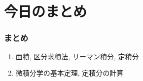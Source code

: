 %
%
%
%













\section{今日のまとめ}
\begin{frame}
\frametitle{まとめ}   


\begin{enumerate}
\item 面積, 区分求積法, リーマン積分, 定積分
\item 微積分学の基本定理, 定積分の計算
\end{enumerate} 


\end{frame}
